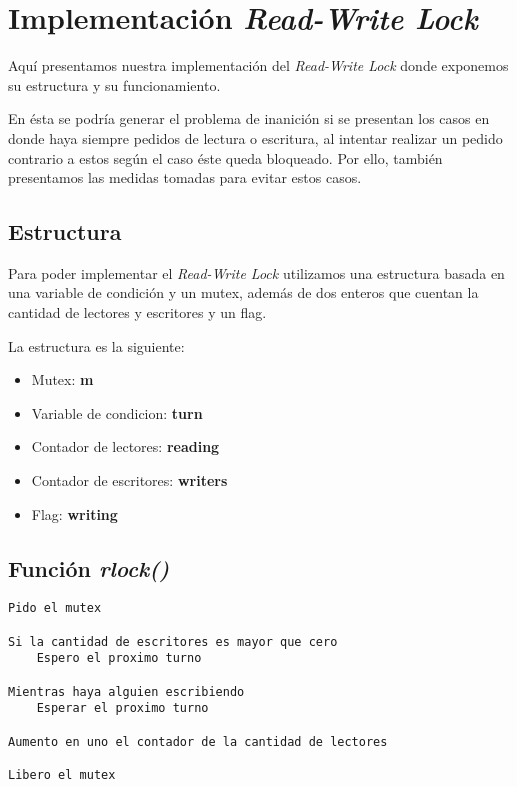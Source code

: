 \section{Implementación \textit{Read-Write Lock}}

Aquí presentamos nuestra implementación del \textit{Read-Write Lock} donde exponemos su estructura y su funcionamiento.

En ésta se podría generar el problema de inanición si se presentan los casos en donde haya siempre pedidos de lectura o escritura, al intentar realizar un pedido contrario a estos según el caso éste queda bloqueado. Por ello, también presentamos las medidas tomadas para evitar estos casos.


\subsection{Estructura}

Para poder implementar el \textit{Read-Write Lock} utilizamos una estructura basada en una variable de condición y un mutex, además de dos enteros que cuentan la cantidad de lectores y escritores y un flag.

La estructura es la siguiente:

\begin{itemize}
	\item Mutex: \textbf{m}
	\item Variable de condicion: \textbf{turn}
	\item Contador de lectores: \textbf{reading}
	\item Contador de escritores: \textbf{writers}
	\item Flag: \textbf{writing}
\end{itemize}


\subsection{Función \textit{rlock()}}

\begin{lstlisting}
Pido el mutex

Si la cantidad de escritores es mayor que cero
	Espero el proximo turno

Mientras haya alguien escribiendo
	Esperar el proximo turno

Aumento en uno el contador de la cantidad de lectores

Libero el mutex
\end{lstlisting}

